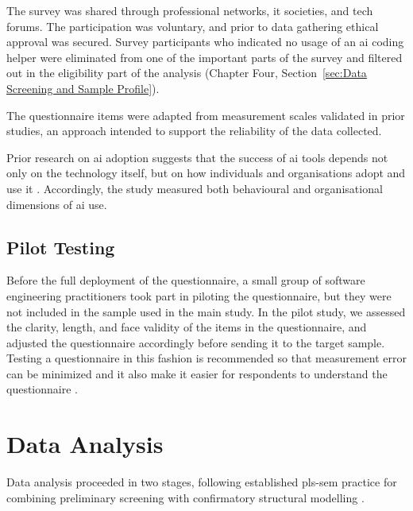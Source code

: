 The survey was shared through professional networks, \gls{it} societies, and tech forums. The participation was voluntary, and prior to data gathering ethical approval was secured. Survey participants who indicated no usage of an \gls{ai} coding helper were eliminated from one of the important parts of the survey and filtered out in the eligibility part of the analysis (Chapter Four, Section~\ref{sec:Data Screening and Sample Profile}).

The questionnaire items were adapted from measurement scales validated in prior studies, an approach intended to support the reliability of the data collected.

Prior research on \gls{ai} adoption suggests that the success of \gls{ai} tools depends not only on the technology itself, but on how individuals and organisations adopt and use it \autocite{Brynjolfsson2025}. Accordingly, the study measured both behavioural and organisational dimensions of \gls{ai} use.

\subsection{Pilot Testing}
\label{sec:Pilot Testing}
Before the full deployment of the questionnaire, a small group of software engineering practitioners took part in piloting the questionnaire, but they were not included in the sample used in the main study. In the pilot study, we assessed the clarity, length, and face validity of the items in the questionnaire, and adjusted the questionnaire accordingly before sending it to the target sample. Testing a questionnaire in this fashion is recommended so that measurement error can be minimized and it also make it easier for respondents to understand the questionnaire \autocite{DeVellis2022}.

\section{Data Analysis}
\label{sec:Data Analysis}
Data analysis proceeded in two stages, following established \gls{pls-sem} practice for combining preliminary screening with confirmatory structural modelling \autocite{Hair2019}.


